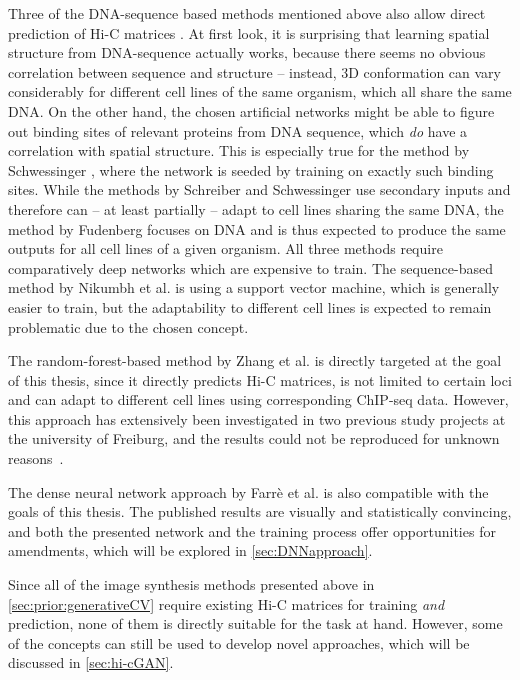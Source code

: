 Three of the DNA-sequence based methods mentioned above also allow direct prediction of Hi-C matrices 
\cite{Schreiber2017, Fudenberg2020, Schwessinger2019}.
At first look, it is surprising that learning spatial structure from DNA-sequence actually works, 
because there seems no obvious correlation between sequence and structure -- 
instead, 3D conformation can vary considerably for different cell lines of the same organism, which all share the same DNA.
On the other hand, the chosen artificial networks might be able to figure out binding sites of relevant proteins from DNA sequence,
which \emph{do} have a correlation with spatial structure. 
This is especially true for the method by Schwessinger \cite{Schwessinger2019},
where the network is seeded by training on exactly such binding sites.
While the methods by Schreiber and Schwessinger use secondary inputs and therefore can -- at least partially -- 
adapt to cell lines sharing the same DNA, the method by Fudenberg focuses on DNA and is thus 
expected to produce the same outputs for all cell lines of a given organism.
All three methods require comparatively deep networks which are expensive to train.
The sequence-based method by Nikumbh et al. \cite{Nikumbh2017} is using a support vector machine, which is generally easier to train,
but the adaptability to different cell lines is expected to remain problematic due to the chosen concept.

The random-forest-based method by Zhang et al. \cite{Zhang2019} is directly targeted at the goal of this thesis,
since it directly predicts Hi-C matrices, is not limited to certain loci and can adapt to different cell lines using 
corresponding ChIP-seq data.
However, this approach has extensively been investigated in two previous study projects at the university of Freiburg,
and the results could not be reproduced for unknown reasons~\cite{Krauth2020,Bajorat2019}.

The dense neural network approach by Farr\`e et al. \cite{Farre2018a} is also compatible with the goals of this thesis.
The published results are visually and statistically convincing, and both the presented network and the training process offer
opportunities for amendments, which will be explored in \cref{sec:DNNapproach}.

Since all of the image synthesis methods presented above in \cref{sec:prior:generativeCV} require existing Hi-C matrices 
for training \emph{and} prediction, none of them is directly suitable for the task at hand.
However, some of the concepts can still be used to develop novel approaches, which will be discussed in \cref{sec:hi-cGAN}.
